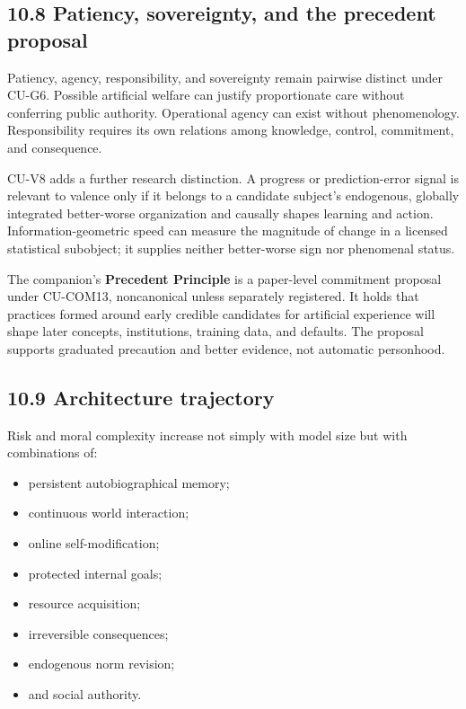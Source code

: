 \documentclass[
  11pt,
]{article}
\providecommand{\tightlist}{%
  \setlength{\itemsep}{0pt}\setlength{\parskip}{0pt}}
\begin{document}
\subsection{10.8 Patiency, sovereignty, and the precedent
proposal}\label{patiency-sovereignty-and-the-precedent-proposal}

Patiency, agency, responsibility, and sovereignty remain pairwise
distinct under CU-G6. Possible artificial welfare can justify
proportionate care without conferring public authority. Operational
agency can exist without phenomenology. Responsibility requires its own
relations among knowledge, control, commitment, and consequence.

CU-V8 adds a further research distinction. A progress or
prediction-error signal is relevant to valence only if it belongs to a
candidate subject's endogenous, globally integrated better-worse
organization and causally shapes learning and action.
Information-geometric speed can measure the magnitude of change in a
licensed statistical subobject; it supplies neither better-worse sign
nor phenomenal status.

The companion's \textbf{Precedent Principle} is a paper-level commitment
proposal under CU-COM13, noncanonical unless separately registered. It
holds that practices formed around early credible candidates for
artificial experience will shape later concepts, institutions, training
data, and defaults. The proposal supports graduated precaution and
better evidence, not automatic personhood.

\subsection{10.9 Architecture trajectory}\label{architecture-trajectory}

Risk and moral complexity increase not simply with model size but with
combinations of:

\begin{itemize}
\tightlist
\item
  persistent autobiographical memory;
\item
  continuous world interaction;
\item
  online self-modification;
\item
  protected internal goals;
\item
  resource acquisition;
\item
  irreversible consequences;
\item
  endogenous norm revision;
\item
  and social authority.
\end{itemize}
\end{document}
